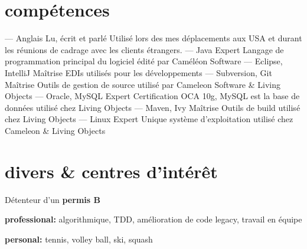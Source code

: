\documentclass{friggeri-cv} 	%
\begin{document}
\section{compétences}

\begin{entrylist}
\entry
{---}
{Anglais}
{Lu, écrit et parlé}
{Utilisé lors des mes déplacements aux USA et durant les réunions de cadrage avec les clients
étrangers.}
\entry
{---}
{Java}
{Expert}
{Langage de programmation principal du logiciel édité par Caméléon Software}
\entry
{---}
{Eclipse, IntelliJ}
{Maîtrise}
{EDIs utilisés pour les développements}
\entry
{---}
{Subversion, Git}
{Maîtrise}
{Outils de gestion de source utilisé par Cameleon Software \& Living Objects}
\entry
{---}
{Oracle, MySQL}
{Expert}
{Certification OCA 10g, MySQL est la base de données utilisé chez Living Objects}
\entry
{---}
{Maven, Ivy}
{Maîtrise}
{Outils de build utilisé chez Living Objects}
\entry
{---}
{Linux}
{Expert}
{Unique système d'exploitation utilisé chez Cameleon \& Living Objects}
\end{entrylist}


\section{divers \& centres d'intérêt}

Détenteur d'un \textbf{permis B}

\textbf{professional:} algorithmique, TDD, amélioration de code legacy, travail en équipe

\textbf{personal:} tennis, volley ball, ski, squash
\end{document}
